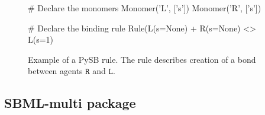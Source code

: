 \documentclass[12pt]{fithesis2}
\begin{document}
\begin{figure}[!h]
\begin{center}
\begin{python}
# Declare the monomers
Monomer('L', ['s'])
Monomer('R', ['s'])

# Declare the binding rule
Rule(L(s=None) + R(s=None) <> L(s=1) %
\end{python}
\end{center}
\caption{Example of a PySB rule. The rule describes creation of a bond between agents $\mathtt{R}$ and $\mathtt{L}$.}\label{PySB-rule}\label{pysb_rule}
\end{figure}

\subsection{SBML-multi package}
\end{document}
